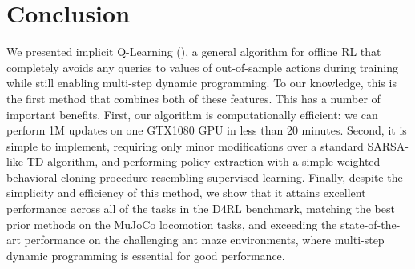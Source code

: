 \vspace{-0.2cm}
\section{Conclusion}
\vspace{-0.2cm}

We presented implicit Q-Learning (\ourname), a general algorithm for offline RL that completely avoids any queries to values of out-of-sample actions during training while still enabling multi-step dynamic programming. To our knowledge, this is the first method that combines both of these features. This has a number of important benefits. First, our algorithm is computationally efficient: we can perform 1M updates on one GTX1080 GPU in less than 20 minutes. Second, it is simple to implement, requiring only minor modifications over a standard SARSA-like TD algorithm, and performing policy extraction with a simple weighted behavioral cloning procedure resembling supervised learning. 
Finally, despite the simplicity and efficiency of this method, we show that it attains excellent performance across all of the tasks in the D4RL benchmark, matching the best prior methods on the MuJoCo locomotion tasks, and exceeding the state-of-the-art performance on the challenging ant maze environments, where multi-step dynamic programming is essential for good performance.
